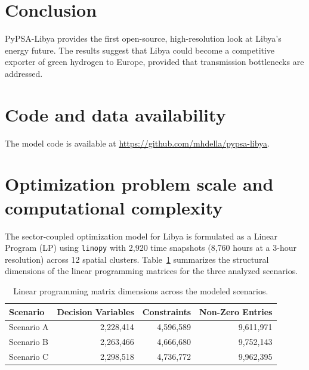 \documentclass[preprint,12pt]{elsarticle}
\begin{document}
\section{Conclusion}
PyPSA-Libya provides the first open-source, high-resolution look at Libya’s energy future. The results suggest that Libya could become a competitive exporter of green hydrogen to Europe, provided that transmission bottlenecks are addressed.


\section*{Code and data availability}
The model code is available at \url{https://github.com/mhdella/pypsa-libya}. 

\appendix
\section{Optimization problem scale and computational complexity}
\label{sec:appendix_problem_scale}

\setcounter{table}{0}
\renewcommand{\thetable}{A.\arabic{table}}
\setcounter{equation}{0}
\renewcommand{\theequation}{A.\arabic{equation}}
\setcounter{figure}{0}
\renewcommand{\thefigure}{A.\arabic{figure}}

The sector-coupled optimization model for Libya is formulated as a Linear Program (LP) using \texttt{linopy} with 2,920 time snapshots (8,760 hours at a 3-hour resolution) across 12 spatial clusters. Table~\ref{tab:problem_dimensions} summarizes the structural dimensions of the linear programming matrices for the three analyzed scenarios.

\begin{table}[htbp]
\centering
\caption{Linear programming matrix dimensions across the modeled scenarios.}
\label{tab:problem_dimensions}
\begin{tabular}{lrrr}
\toprule
{Scenario} & {Decision Variables} & {Constraints} & {Non-Zero Entries} \\ \midrule
Scenario A & 2,228,414 & 4,596,589 & 9,611,971 \\
Scenario B & 2,263,466 & 4,666,680 & 9,752,143 \\
Scenario C & 2,298,518 & 4,736,772 & 9,962,395 \\ \bottomrule
\end{tabular}
\end{table}
\end{document}
